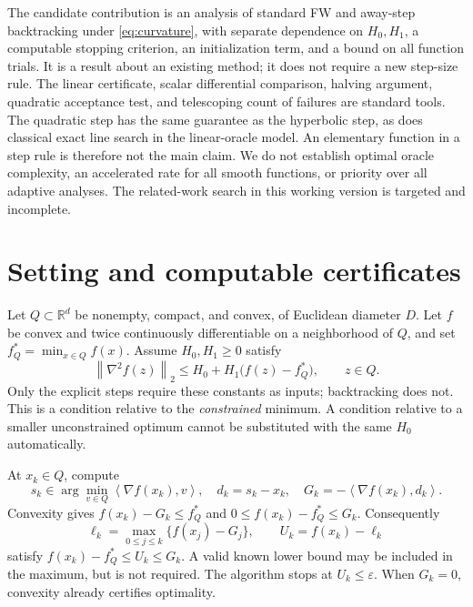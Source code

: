 \documentclass[11pt]{article}
\newcommand{\norm}[1]{\left\|#1\right\|}
\newcommand{\inner}[2]{\left\langle#1,#2\right\rangle}
\newcommand{\R}{\mathbb R}
\begin{document}
The candidate contribution is an analysis of standard FW and away-step
backtracking under
\eqref{eq:curvature}, with separate dependence on $H_0,H_1$, a computable
stopping criterion, an initialization term, and a bound on all function
trials. It is a result about an existing method; it does not require a
new step-size rule. The linear certificate, scalar
differential comparison, halving argument, quadratic acceptance test, and
telescoping count of failures are standard tools. The quadratic step has
the same guarantee as the hyperbolic step, as does classical exact line
search in the linear-oracle model. An elementary function in a step rule
is therefore not the main claim. We do not establish optimal oracle
complexity, an accelerated rate for all smooth functions, or priority over
all adaptive analyses. The related-work search in this working version is
targeted and incomplete.

\section{Setting and computable certificates}
Let $Q\subset\R^d$ be nonempty, compact, and convex, of Euclidean diameter
$D$. Let $f$ be convex and twice continuously differentiable on a neighborhood
of $Q$, and set $f_Q^*=\min_{x\in Q}f(x)$. Assume $H_0,H_1\ge0$ satisfy
\begin{equation}\label{eq:curvature}
 \norm{\nabla^2 f(z)}_2\le H_0+H_1\bigl(f(z)-f_Q^*\bigr),\qquad z\in Q.
\end{equation}
Only the explicit steps require these constants as inputs; backtracking
does not. This is a condition relative to the \emph{constrained} minimum. A condition
relative to a smaller unconstrained optimum cannot be substituted with the
same $H_0$ automatically.

At $x_k\in Q$, compute
\begin{equation}\label{eq:gap}
 s_k\in\arg\min_{v\in Q}\inner{\nabla f(x_k)}{v},\quad
 d_k=s_k-x_k,\quad G_k=-\inner{\nabla f(x_k)}{d_k}.
\end{equation}
Convexity gives $f(x_k)-G_k\le f_Q^*$ and
$0\le f(x_k)-f_Q^*\le G_k$. Consequently
\begin{equation}\label{eq:certificate}
 \ell_k=\max_{0\le j\le k}\{f(x_j)-G_j\},\qquad
 U_k=f(x_k)-\ell_k
\end{equation}
satisfy $f(x_k)-f_Q^*\le U_k\le G_k$. A valid known lower bound may be
included in the maximum, but is not required. The algorithm stops at
$U_k\le\varepsilon$. When $G_k=0$, convexity already certifies optimality.
\end{document}
